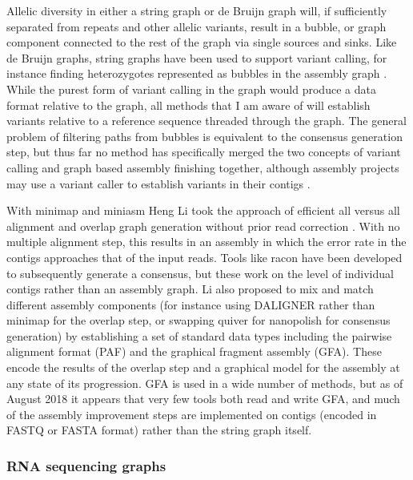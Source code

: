 Allelic diversity in either a string graph or de Bruijn graph will, if sufficiently separated from repeats and other allelic variants, result in a bubble, or graph component connected to the rest of the graph via single sources and sinks.
Like de Bruijn graphs, string graphs have been used to support variant calling, for instance finding heterozygotes represented as bubbles in the assembly graph \cite{li2012exploring}.
While the purest form of variant calling in the graph would produce a data format relative to the graph, all methods that I am aware of will establish variants relative to a reference sequence threaded through the graph.
The general problem of filtering paths from bubbles is equivalent to the consensus generation step, but thus far no method has specifically merged the two concepts of variant calling and graph based assembly finishing together, although assembly projects may use a variant caller to establish variants in their contigs \cite{jain2018nanopore,schmid2018pushing}.

With minimap and miniasm Heng Li took the approach of efficient all versus all alignment and overlap graph generation without prior read correction \cite{li2016minimap}.
With no multiple alignment step, this results in an assembly in which the error rate in the contigs approaches that of the input reads.
Tools like racon \cite{vaser2017fast} have been developed to subsequently generate a consensus, but these work on the level of individual contigs rather than an assembly graph.
Li \cite{li2016minimap} also proposed to mix and match different assembly components (for instance using DALIGNER \cite{myers2014efficient} rather than minimap for the overlap step, or swapping quiver for nanopolish for consensus generation) by establishing a set of standard data types including the pairwise alignment format (PAF) and the graphical fragment assembly (GFA).
These encode the results of the overlap step and a graphical model for the assembly at any state of its progression.
GFA is used in a wide number of methods, but as of August 2018 it appears that very few tools both read and write GFA, and much of the assembly improvement steps are implemented on contigs (encoded in FASTQ or FASTA format) rather than the string graph itself.


\subsubsection{RNA sequencing graphs}
\label{sec:rna_seq}

